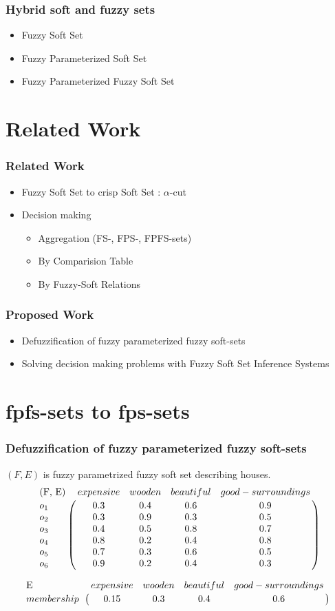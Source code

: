 \documentclass{beamer}
\begin{document}
  \begin{frame}
    \frametitle{Hybrid soft and fuzzy sets}
    \begin{itemize}
    \item Fuzzy Soft Set \cite{fssets}
    \item Fuzzy Parameterized Soft Set \cite{fpfstheory}
    \item Fuzzy Parameterized Fuzzy Soft  Set \cite{fpfstheory}
    \end{itemize}
  \end{frame}
\section{Related Work}
  \begin{frame}
    \frametitle{Related Work}
    \begin {itemize}
    	\item Fuzzy Soft Set to crisp Soft Set :  $\alpha$-cut \cite{alphacut}
    	\item Decision making 
    	\begin {itemize}
    		\item Aggregation (FS-, FPS-, FPFS-sets) \cite{fstheory} \cite{fpfstheory}
    		\item By Comparision Table \cite{fscomparision}
    		\item By Fuzzy-Soft Relations \cite{fsrelation}
    	\end {itemize}
    \end {itemize}
  \end{frame}

  \begin{frame}
    \frametitle{Proposed Work}
    \begin {itemize}
        \item Defuzzification of fuzzy parameterized fuzzy soft-sets
        \item Solving decision making problems with Fuzzy Soft Set Inference Systems
    \end {itemize}
  \end{frame}

	\section{fpfs-sets to fps-sets}
  \begin{frame}
    \frametitle{Defuzzification of fuzzy parameterized fuzzy soft-sets}
    $(F, E)$ is fuzzy parametrized fuzzy soft set describing houses.
     $$\bordermatrix{
  \text{(F, E)} & expensive & wooden & beautiful & good-surroundings  \cr
  o_1 & 0.3 & 0.4 & 0.6 & 0.9 \cr
  o_2 & 0.3 & 0.9 & 0.3 & 0.5 \cr
  o_3 & 0.4 & 0.5 & 0.8 & 0.7 \cr
  o_4 & 0.8 & 0.2 & 0.4 & 0.8 \cr
  o_5 & 0.7 & 0.3 & 0.6 & 0.5 \cr
  o_6 & 0.9 & 0.2 & 0.4 & 0.3 }$$
  
  $$\bordermatrix{
  \text{E} & expensive & wooden & beautiful & good-surroundings\cr
  membership & 0.15 & 0.3 & 0.4 & 0.6 }$$
  \end{frame}
  
\end{document}
